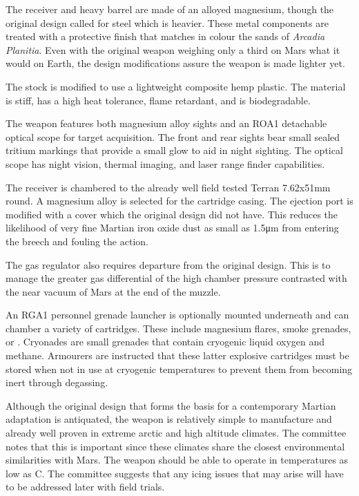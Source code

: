 The receiver and heavy barrel are made of an alloyed magnesium, though the original design called for steel which is heavier. These metal components are treated with a protective finish that matches in colour the sands of {\it Arcadia Planitia}. Even with the original weapon weighing only a third on Mars what it would on Earth, the design modifications assure the weapon is made lighter yet.

The stock is modified to use a lightweight composite hemp plastic. The material is stiff, has a high heat tolerance, flame retardant, and is biodegradable.

The weapon features both magnesium alloy sights and an ROA1 detachable optical scope for target acquisition. The front and rear sights bear small sealed tritium markings that provide a small glow to aid in night sighting. The optical scope has night vision, thermal imaging, and laser range finder capabilities.

The receiver is chambered to the already well field tested Terran 7.62x51mm round. A magnesium alloy is selected for the cartridge casing. The ejection port is modified with a cover which the original design did not have. This reduces the likelihood of very fine Martian iron oxide dust as small as 1.5μm from entering the breech and fouling the action.

The gas regulator also requires departure from the original design. This is to manage the greater gas differential of the high chamber pressure contrasted with the near vacuum of Mars at the end of the muzzle.

An RGA1 personnel grenade launcher is optionally mounted underneath and can chamber a variety of cartridges. These include magnesium flares, smoke grenades, or . Cryonades are small grenades that contain cryogenic liquid oxygen and methane. Armourers are instructed that these latter explosive cartridges must be stored when not in use at cryogenic temperatures to prevent them from becoming inert through degassing.

Although the original design that forms the basis for a contemporary Martian adaptation is antiquated, the weapon is relatively simple to manufacture and already well proven in extreme arctic and high altitude climates. The committee notes that this is important since these climates share the closest environmental similarities with Mars. The weapon should be able to operate in temperatures as low as C. The committee suggests that any icing issues that may arise will have to be addressed later with field trials.
\StopTimelineDate

